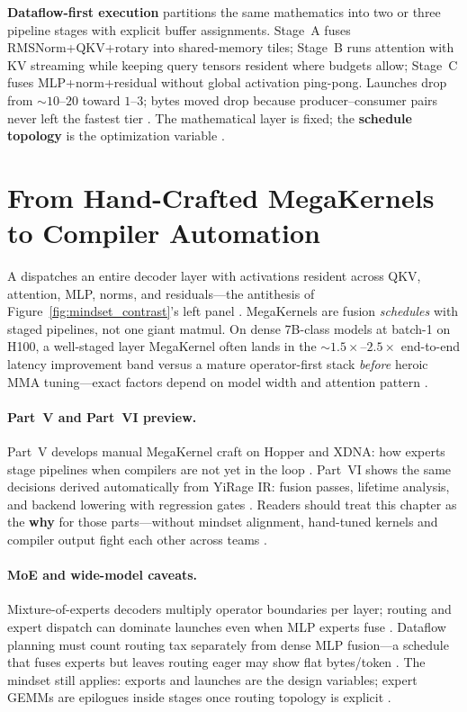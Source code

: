 \textbf{Dataflow-first execution} partitions the same mathematics into two or three pipeline stages with explicit buffer assignments.
Stage~A fuses RMSNorm+QKV+rotary into shared-memory tiles; Stage~B runs attention with KV streaming while keeping query tensors resident where budgets allow; Stage~C fuses MLP+norm+residual without global activation ping-pong.
Launches drop from ${\sim}10$--$20$ toward $1$--$3$; bytes moved drop because producer--consumer pairs never left the fastest tier \citep{memoryfloor2026}.
The mathematical layer is fixed; the \textbf{schedule topology} is the optimization variable \citep{chen2020compilerbasedhardw}.

\section{From Hand-Crafted MegaKernels to Compiler Automation}
\label{sec:megakernel_automation}

A  dispatches an entire decoder layer with activations resident across QKV, attention, MLP, norms, and residuals---the antithesis of Figure~\ref{fig:mindset_contrast}'s left panel \citep{memoryfloor2026}.
MegaKernels are fusion \emph{schedules} with staged pipelines, not one giant matmul.
On dense 7B-class models at batch-1 on H100, a well-staged layer MegaKernel often lands in the ${\sim}1.5\times$--$2.5\times$ end-to-end latency improvement band versus a mature operator-first stack \emph{before} heroic MMA tuning---exact factors depend on model width and attention pattern \citep{taxbreak2026,yirage2026}.

\paragraph{Part~V and Part~VI preview.}
Part~V develops manual MegaKernel craft on Hopper and XDNA: how experts stage pipelines when compilers are not yet in the loop \citep{nvidia2022hopper,amd2024xdna}.
Part~VI shows the same decisions derived automatically from YiRage IR: fusion passes, lifetime analysis, and backend lowering with regression gates \citep{yirage2026,chen2020compilerbasedhardw}.
Readers should treat this chapter as the \textbf{why} for those parts---without mindset alignment, hand-tuned kernels and compiler output fight each other across teams \citep{patel2025llminference}.

\paragraph{MoE and wide-model caveats.}
Mixture-of-experts decoders multiply operator boundaries per layer; routing and expert dispatch can dominate launches even when MLP experts fuse \citep{liu2024deepseekv3,taxbreak2026}.
Dataflow planning must count routing tax separately from dense MLP fusion---a schedule that fuses experts but leaves routing eager may show flat bytes/token \citep{memoryfloor2026}.
The mindset still applies: exports and launches are the design variables; expert GEMMs are epilogues inside stages once routing topology is explicit \citep{yirage2026}.

